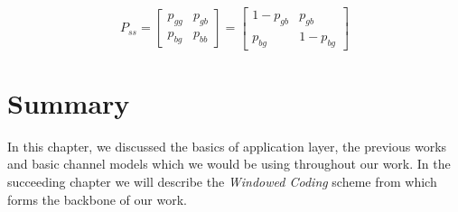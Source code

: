 \begin{equation}
	P_{ss} = \begin{bmatrix} p_{gg} & p_{gb} \\ p_{bg} & p_{bb}\end{bmatrix} = \begin{bmatrix} 1 - p_{gb} & p_{gb} \\ p_{bg} & 1 - p_{bg}\end{bmatrix}
\end{equation}


\section{Summary}

In this chapter, we discussed the basics of application layer, the previous works and basic channel models which we would be using throughout our work. In the succeeding chapter we will describe the \textit{Windowed Coding} scheme from \cite{borkotokyicc} which forms the backbone of our work.


